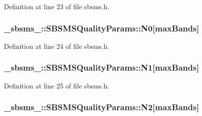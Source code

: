 Definition at line 23 of file sbsms.\+h.

\subsubsection[{\texorpdfstring{N0}{N0}}]{ \+\_\+sbsms\+\_\+\+::\+S\+B\+S\+M\+S\+Quality\+Params\+::\+N0\mbox{[}{\bf max\+Bands}\mbox{]}}\hypertarget{struct__sbsms___1_1_s_b_s_m_s_quality_params_a738b1587be2e5559c12a80c0a081a731}{}\label{struct__sbsms___1_1_s_b_s_m_s_quality_params_a738b1587be2e5559c12a80c0a081a731}


Definition at line 24 of file sbsms.\+h.

\subsubsection[{\texorpdfstring{N1}{N1}}]{ \+\_\+sbsms\+\_\+\+::\+S\+B\+S\+M\+S\+Quality\+Params\+::\+N1\mbox{[}{\bf max\+Bands}\mbox{]}}\hypertarget{struct__sbsms___1_1_s_b_s_m_s_quality_params_aab33c781a432fc87d6f1b762ca9e2aff}{}\label{struct__sbsms___1_1_s_b_s_m_s_quality_params_aab33c781a432fc87d6f1b762ca9e2aff}


Definition at line 25 of file sbsms.\+h.

\subsubsection[{\texorpdfstring{N2}{N2}}]{ \+\_\+sbsms\+\_\+\+::\+S\+B\+S\+M\+S\+Quality\+Params\+::\+N2\mbox{[}{\bf max\+Bands}\mbox{]}}\hypertarget{struct__sbsms___1_1_s_b_s_m_s_quality_params_a1fd7199cccf829c490cbf88aba499e30}{}\label{struct__sbsms___1_1_s_b_s_m_s_quality_params_a1fd7199cccf829c490cbf88aba499e30}


